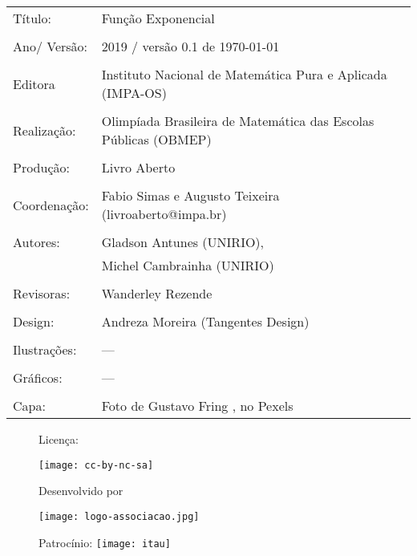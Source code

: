 \begin{tabular}{p{}p{}}
Título: & Função Exponencial\\
\\
Ano/ Versão: & 2019 / versão 0.1 de \today\\
\\
Editora & Instituto Nacional de Matem\'atica Pura e Aplicada (IMPA-OS)\\
\\
Realização:& Olimp\'iada Brasileira de Matem\'atica das Escolas P\'ublicas (OBMEP)\\
\\
Produção:& Livro Aberto\\
\\
Coordenação:& Fabio Simas e Augusto Teixeira (livroaberto@impa.br)\\
\\
  Autores: & Gladson Antunes (UNIRIO),\\
        & Michel Cambrainha (UNIRIO)\\
\\
Revisoras: & Wanderley Rezende \\
\\
Design: & Andreza Moreira (Tangentes Design) \\
\\
  Ilustrações: & --- \\ 
\\
Gráficos: & --- \\
\\
  Capa: & Foto de Gustavo Fring , no Pexels \\

\end{tabular}


\begin{figure}[b]
\begin{minipage}[l]{5cm}
\centering

{\large Licença:}

  \texttt{[image: cc-by-nc-sa]}
\end{minipage}\hfill
\begin{minipage}[c]{5cm}
\centering
{\large Desenvolvido por}

\texttt{[image: logo-associacao.jpg]}
\end{minipage}
\begin{minipage}[r]{5cm}
\centering

{\large Patrocínio:}
  \vspace{1em}
  \texttt{[image: itau]}
\end{minipage}
\end{figure}

